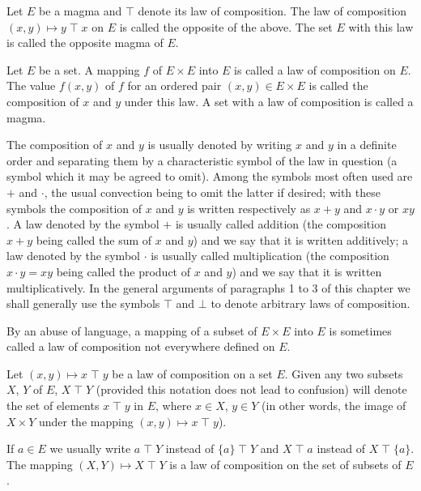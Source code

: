 \documentclass[twoside,usebookdim]{bourbaki}
\begin{document}
\begin{definition}
Let $E$ be a magma and $\mathbin{\top}$ denote its law of composition. The law of
composition $(x, y)\mapsto y\mathbin{\top} x$ on $E$ is called the opposite of the
above. The set $E$ with this law is called the opposite magma of $E$.
\end{definition}

\begin{definition}
Let $E$ be a set. A mapping $f$ of $E\times E$ into $E$ is called a law
of composition on $E$. The value $f(x,y)$ of $f$ for an ordered pair
$(x,y)\in E\times E$ is called the composition of $x$ and $y$ under this
law. A set with a law of composition is called a magma.
\end{definition}

The composition of $x$ and $y$ is usually denoted by writing $x$ and $y$
in a definite order and separating them by a characteristic symbol of
the law in question (a symbol which it may be agreed to omit). Among the
symbols most often used are $+$ and $\cdot$, the usual convection being
to omit the latter if desired; with these symbols the composition of $x$
and $y$ is written respectively as $x + y$ and $x\cdot y$ or $xy$.
A law denoted by the symbol $+$ is usually called addition (the
composition $x + y$ being called the sum of $x$ and $y$) and we say that
it is written additively; a law denoted by the symbol $\cdot$ is usually
called multiplication (the composition $x\cdot y = xy$ being called the
product of $x$ and $y$) and we say that it is written
multiplicatively. In the general arguments of paragraphs 1 to 3 of this
chapter we shall generally use the symbols $\mathbin{\top}$ and $\bot$ to denote
arbitrary laws of composition.

By an abuse of language, a mapping of a subset of $E\times E$ into $E$
is sometimes called a law of composition not everywhere defined on $E$.

Let $(x,y)\mapsto x\mathbin{\top} y$ be a law of composition on a set $E$. Given
any two subsets $X$, $Y$ of $E$, $X \mathbin{\top} Y$ (provided this notation does
not lead to confusion) will denote the set of elements $x\mathbin{\top} y$ in $E$,
where $x\in X$, $y\in Y$ (in other words, the image of $X\times Y$ under
the mapping $(x,y)\mapsto x\mathbin{\top} y$).

If $a\in E$ we usually write $a\mathbin{\top} Y$ instead of $\{a\}\mathbin{\top} Y$ and
$X\mathbin{\top} a$ instead of $X\mathbin{\top}\{a\}$. The mapping $(X, Y)\mapsto X\mathbin{\top} Y$
is a law of composition on the set of subsets of $E$.
\end{document}

